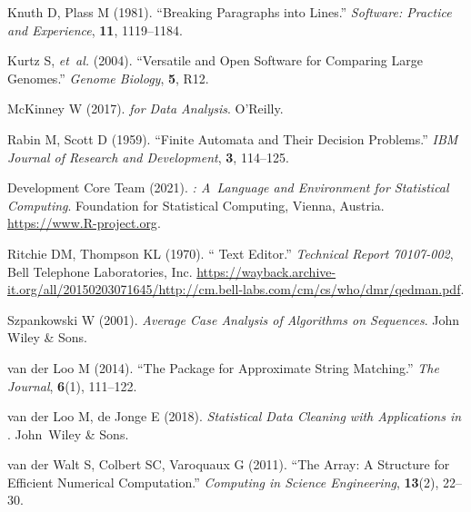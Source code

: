 \documentclass[nojss]{jss}
\begin{document}
\begin{thebibliography}{35}
Knuth D, Plass M (1981).
\newblock \enquote{Breaking Paragraphs into Lines.}
\newblock \emph{Software: Practice and Experience}, \textbf{11}, 1119--1184.

Kurtz S, \emph{et~al.} (2004).
\newblock \enquote{Versatile and Open Software for Comparing Large Genomes.}
\newblock \emph{Genome Biology}, \textbf{5}, R12.

McKinney W (2017).
\newblock \emph{ for Data Analysis}.
\newblock O'Reilly.

Rabin M, Scott D (1959).
\newblock \enquote{Finite Automata and Their Decision Problems.}
\newblock \emph{IBM Journal of Research and Development}, \textbf{3}, 114--125.

{ Development Core Team} (2021).
\newblock \emph{: {A}~Language and Environment for Statistical
  Computing}.
\newblock {} Foundation for Statistical Computing, Vienna, Austria.
\newblock \url{https://www.R-project.org}.

Ritchie DM, Thompson KL (1970).
\newblock \enquote{ Text Editor.}
\newblock \emph{Technical Report 70107-002}, Bell Telephone Laboratories, Inc.
\newblock
  \urlprefix\url{https://wayback.archive-it.org/all/20150203071645/http://cm.bell-labs.com/cm/cs/who/dmr/qedman.pdf}.

Szpankowski W (2001).
\newblock \emph{Average Case Analysis of Algorithms on Sequences}.
\newblock John Wiley \& Sons.

{van der Loo} M (2014).
\newblock \enquote{The  Package for Approximate String
  Matching.}
\newblock \emph{The  Journal}, \textbf{6}(1), 111--122.

{van der Loo} M, {de Jonge} E (2018).
\newblock \emph{Statistical Data Cleaning with Applications in }.
\newblock John~Wiley \& Sons.

{van der Walt} S, {Colbert} SC, {Varoquaux} G (2011).
\newblock \enquote{The  Array: {A} Structure for Efficient Numerical
  Computation.}
\newblock \emph{Computing in Science Engineering}, \textbf{13}(2), 22--30.


\end{thebibliography}
\end{document}

